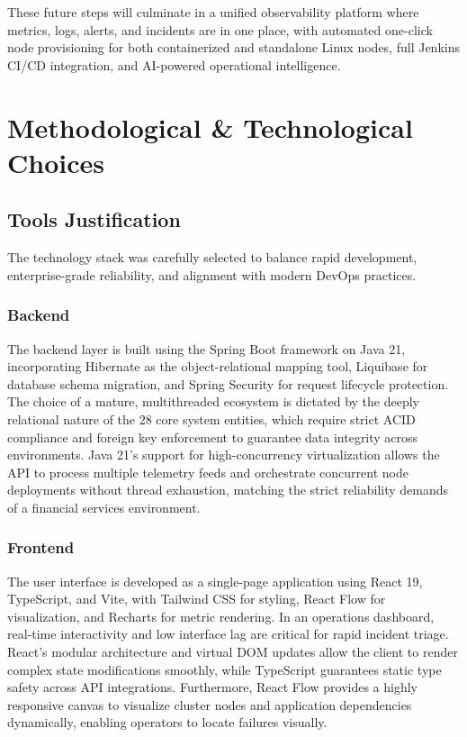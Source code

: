 \documentclass[12pt,a4paper]{report}
\begin{document}
These future steps will culminate in a unified observability platform where metrics, logs, alerts, and incidents are in one place, with automated one-click node provisioning for both containerized and standalone Linux nodes, full Jenkins CI/CD integration, and AI-powered operational intelligence.

\section{Methodological \& Technological Choices}

\subsection{Tools Justification}

The technology stack was carefully selected to balance rapid development, enterprise-grade reliability, and alignment with modern DevOps practices.

\subsubsection{Backend}
The backend layer is built using the Spring Boot framework on Java 21, incorporating Hibernate as the object-relational mapping tool, Liquibase for database schema migration, and Spring Security for request lifecycle protection. The choice of a mature, multithreaded ecosystem is dictated by the deeply relational nature of the 28 core system entities, which require strict ACID compliance and foreign key enforcement to guarantee data integrity across environments. Java 21's support for high-concurrency virtualization allows the API to process multiple telemetry feeds and orchestrate concurrent node deployments without thread exhaustion, matching the strict reliability demands of a financial services environment.

\subsubsection{Frontend}
The user interface is developed as a single-page application using React 19, TypeScript, and Vite, with Tailwind CSS for styling, React Flow for visualization, and Recharts for metric rendering. In an operations dashboard, real-time interactivity and low interface lag are critical for rapid incident triage. React's modular architecture and virtual DOM updates allow the client to render complex state modifications smoothly, while TypeScript guarantees static type safety across API integrations. Furthermore, React Flow provides a highly responsive canvas to visualize cluster nodes and application dependencies dynamically, enabling operators to locate failures visually.
\end{document}
